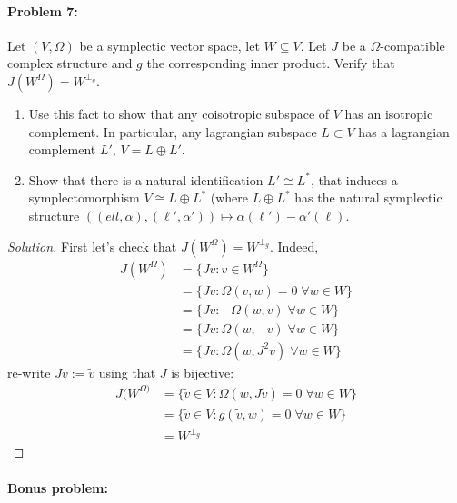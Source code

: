 \paragraph{Problem 7:} Let $(V,\Omega)$ be a symplectic vector space, let $W\subseteq V$. Let $J$ be a $\Omega$-compatible complex structure and $g$ the corresponding inner product. Verify that $J(W^{\Omega} )=W^{\perp_{g}}$.
\begin{enumerate}[label=\alph*.]
	\item Use this fact to show that any coisotropic subspace of $V$ has an isotropic complement. In particular, any lagrangian subspace $L\subset V$ has a lagrangian complement $L'$, $V=L\oplus L'$.
	
	\item Show that there is a natural identification $L'\cong L^{*}$, that induces a symplectomorphism $V\cong L\oplus L^{*}$ (where $L\oplus L^{*}$ has the natural symplectic structure $\left( (ell,\alpha),(\ell',\alpha') \right) \mapsto \alpha(\ell')-\alpha'(\ell)$.
\end{enumerate}

\begin{proof}[Solution]\leavevmode
	First let's check that $J(W^{\Omega} )=W^{\perp_{g}}$. Indeed,
	\begin{align*}
		J(W^{\Omega} )&= \{Jv:v\in W^{\Omega}\}\\
&=\{Jv:\Omega(v,w)=0\;\forall w\in W\} \\
&=\{Jv:-\Omega(w,v)\;\forall w\in W\} \\
& =\{Jv:\Omega(w,-v)\;\forall w\in W\} \\
&=\{Jv:\Omega(w,J^{2}v)\;\forall w\in W\}
	\end{align*}
re-write $Jv:=\tilde{v}$ using that $J$ is bijective:
	\begin{align*}
J(W^{\Omega)}&=\{\tilde{v}\in V:\Omega(w,J\tilde{v})=0\;\forall w\in W\} \\
&=\{ \tilde{v}\in V:g(\tilde{v},w)=0\;\forall w\in W\} \\
& =W^{\perp_{g}}
	\end{align*}


\end{proof}

\paragraph{Bonus problem: } 


